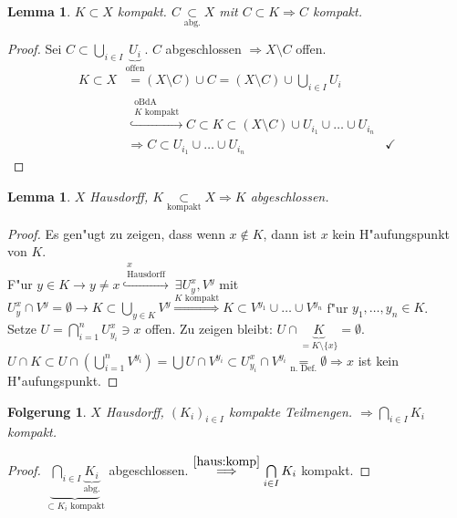 \documentclass[a4paper,12pt,numbers=noenddot,parskip=full]{scrartcl}
\newcommand{\Exists}{~\exists}
\theoremstyle{dotless}
\newtheorem{corollary}[theorem]{Folgerung}
\newtheorem{lemma}[theorem]{Lemma}
\begin{document}
\begin{lemma}
	$K \subset X$ kompakt. $C \underset{\text{abg.}}{\subset} X$ mit $C \subset K \Longrightarrow C$ kompakt.
\end{lemma}
\begin{proof}
	Sei $C \subset \bigcup\limits_{i \in I} \underbrace{U_i}_{\text{offen}}$. $C$ abgeschlossen $\Longrightarrow X \setminus C$ offen.
	\begin{align*}
		K \subset X &= (X \setminus C) \cup C = (X \setminus C) \cup \bigcup\limits_{i \in I} U_i\\
		&\overset{\substack{\text{oBdA}\\K \text{ kompakt}}}{\hookrightarrow} C \subset K \subset (X \setminus C) \cup U_{i_1} \cup \dots \cup U_{i_n}\\
		&\Longrightarrow C \subset U_{i_1} \cup \dots \cup U_{i_n} &\checkmark
	\end{align*}
\end{proof}
\begin{lemma}\label{haus:komp}
	$X$ Hausdorff, $K \underset{\text{kompakt}}{\subset} X \Longrightarrow K$ abgeschlossen.
\end{lemma}
\begin{proof}
	Es gen"ugt zu zeigen, dass wenn $x \notin K$, dann ist $x$ kein H"aufungspunkt von $K$.\\
	F"ur $y \in K \rightarrow y \neq x \overset{\substack{x\\ \text{Hausdorff}}}{\hookrightarrow} \Exists U^x_y, V^y$ mit $U^x_y \cap V^y = \emptyset \rightarrow K \subset \bigcup\limits_{y \in K} V^y \overset{K\text{ kompakt}}{\Longrightarrow} K \subset V^{y_1} \cup \dots \cup V^{y_n}$ f"ur $y_1, \dots, y_n \in K$.\\
	Setze $U = \bigcap\limits_{i=1}^n U^x_{y_i} \ni x$ offen. Zu zeigen bleibt: $U \cap \underbrace{K}_{=K \setminus \{x\}} = \emptyset$.\\
	$U \cap K \subset U \cap (\bigcup\limits_{i=1}^n V^{y_i}) = \bigcup U \cap V^{y_i} \subset U^x_{y_i} \cap V^{y_i} \underset{\text{n. Def.}}{=} \emptyset \Rightarrow x$ ist kein H"aufungspunkt.
\end{proof}
\begin{corollary}
	$X$ Hausdorff, $(K_i)_{i \in I}$ kompakte Teilmengen. $\Longrightarrow \bigcap\limits_{i \in I} K_i$ kompakt.
\end{corollary}
\begin{proof}
	$\underbrace{\bigcap\limits_{i \in I} \underbrace{K_i}_{\text{abg.}}}_{\subset K_i \text{ kompakt}}$ abgeschlossen. $\overset{\eqref{haus:komp}}{\Longrightarrow} \bigcap\limits_{i \in I} K_i$ kompakt.
\end{proof}
\end{document}
